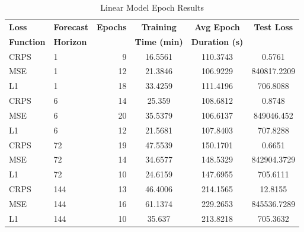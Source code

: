 \documentclass{article}
\begin{document}
\begin{table}
    \footnotesize
    \centering
    \caption{Linear Model Epoch Results}
    \begin{tabular}{l|l|r|S|S|S}
        \toprule
        \textbf{Loss} & \textbf{Forecast} & \textbf{Epochs} & \textbf{Training} & \textbf{Avg Epoch} & \textbf{Test Loss} \\
        \textbf{Function} & \textbf{Horizon} & & \textbf{Time (min)} & \textbf{Duration (s)} & \\
        \midrule
        CRPS & 1 & 9 & 16.5561 & 110.3743 & 0.5761 \\
        MSE & 1 & 12 & 21.3846 & 106.9229 & 840817.2209 \\
        L1 & 1 & 18 & 33.4259 & 111.4196 & 706.8088 \\
        \midrule
        CRPS & 6 & 14 & 25.359 & 108.6812 & 0.8748 \\
        MSE & 6 & 20 & 35.5379 & 106.6137 & 849046.452 \\
        L1 & 6 & 12 & 21.5681 & 107.8403 & 707.8288 \\
        \midrule
        CRPS & 72 & 19 & 47.5539 & 150.1701 & 0.6651 \\
        MSE & 72 & 14 & 34.6577 & 148.5329 & 842904.3729 \\
        L1 & 72 & 10 & 24.6159 & 147.6955 & 705.6111 \\
        \midrule
        CRPS & 144 & 13 & 46.4006 & 214.1565 & 12.8155 \\
        MSE & 144 & 16 & 61.1374 & 229.2653 & 845536.7289 \\
        L1 & 144 & 10 & 35.637 & 213.8218 & 705.3632 \\
    \bottomrule
    \end{tabular}
    \label{tab:linear_epoch}
\end{table}
\end{document}
